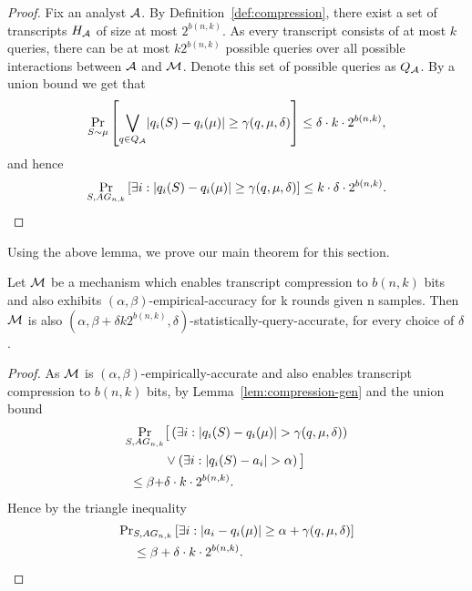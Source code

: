 \documentclass[12pt,a4paper,oneside,onecolumn]{book}
\begin{document}
\begin{proof}%
  Fix an analyst $\mathcal{A}$.
  By Definition~\ref{def:compression}, there exist a set of transcripts $H_{\mathcal{A}}$
  of size at most $2^{b(n,k)}$.
  As every transcript consists of at most $k$ queries,
  there can be at most $k2^{b(n,k)}$ possible queries over all possible interactions between $\mathcal{A}$ and $\mathcal{M}$.
  Denote this set of possible queries as $Q_{\mathcal{A}}$. By a union bound we get that
    \[
    \Pr_{S \sim \mu}\left[ \bigvee_{q \in Q_{\mathcal{A}}} \lvert q_i(S) - q_i(\mu)\rvert \geq \gamma(q,\mu,\delta) \right]
    \leq \delta \cdot  k \cdot 2^{b(n,k)},    
  \]
  and hence
  \[
    \Pr_{S, AG_{n,k}}\left[ \exists i: \lvert q_i(S) - q_i(\mu)\rvert \geq \gamma(q,\mu,\delta) \right]
    \leq k \cdot \delta \cdot 2^{b(n,k)}.    
  \]
\end{proof}

Using the above lemma, we prove our main theorem for this section.

\begin{theorem}
  \label{thm:compression-accuracy}
  Let $\mathcal{M}$ be a mechanism which enables transcript compression to $b(n,k)$ bits
  and also exhibits $(\alpha, \beta)$-empirical-accuracy for k rounds given n samples.
  Then $\mathcal{M}$ is also 
  $(\alpha,\beta +\delta  k 2^{b(n,k)},\delta)$-statistically-query-accurate, for every choice of $\delta$.
\end{theorem}

\begin{proof}%
  As $\mathcal{M}$ is $(\alpha, \beta)$-empirically-accurate and also
  enables transcript compression to $b(n,k)$ bits,
  by Lemma~\ref{lem:compression-gen} and the union bound 
  \begin{align*}
    \Pr_{S, AG_{n,k}}
    &\big[
      \left(\exists i: \lvert q_i(S) - q_i(\mu)\rvert > \gamma(q,\mu,\delta)  \right) \\
      &\vee
      \left(\exists i: \lvert q_i(S) - a_i\rvert > \alpha \right)      
    \big] \\
    \leq
    \beta + &\delta \cdot k \cdot 2^{b(n,k)}.
  \end{align*}
    Hence by the triangle inequality
    \begin{align*}
      \Pr&_{S, AG_{n,k}}
      \left[ \exists i: \lvert a_i - q_i(\mu)\rvert \geq \alpha + \gamma(q,\mu,\delta)  \right]\\
      &\leq 
      \beta + \delta \cdot k \cdot 2^{b(n,k)}.
    \end{align*}
  \end{proof}
\end{document}
